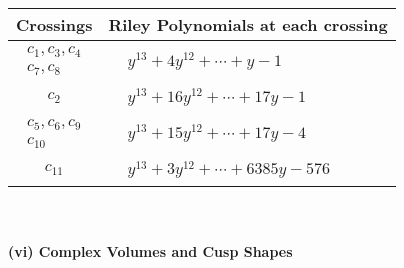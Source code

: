 \documentclass[1p]{elsarticle_modified}
\theoremstyle{definition}
\begin{document}
\begin{tabular}{m{50pt}|m{274pt}}
Crossings & \hspace{64pt}Riley Polynomials at each crossing \\
\hline $$\begin{aligned}c_{1},c_{3},c_{4}\\c_{7},c_{8}\end{aligned}$$&$\begin{aligned}
&y^{13}+4 y^{12}+\cdots+y-1
\end{aligned}$\\
\hline $$\begin{aligned}c_{2}\end{aligned}$$&$\begin{aligned}
&y^{13}+16 y^{12}+\cdots+17 y-1
\end{aligned}$\\
\hline $$\begin{aligned}c_{5},c_{6},c_{9}\\c_{10}\end{aligned}$$&$\begin{aligned}
&y^{13}+15 y^{12}+\cdots+17 y-4
\end{aligned}$\\
\hline $$\begin{aligned}c_{11}\end{aligned}$$&$\begin{aligned}
&y^{13}+3 y^{12}+\cdots+6385 y-576
\end{aligned}$\\
\hline
\end{tabular}\\~\\
\newpage\flushleft \textbf{(vi) Complex Volumes and Cusp Shapes}
\end{document}
